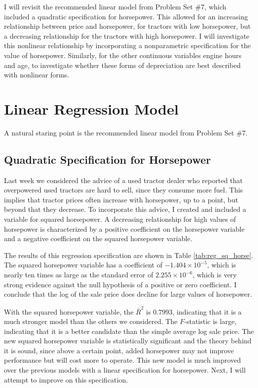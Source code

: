 \documentclass[11pt]{paper}
\begin{document}
I will revisit the recommended linear model
from Problem Set \#7, 
which included a quadratic specification for horsepower.
This allowed for an increasing relationship 
between price and horsepower, 
for tractors with low horsepower, 
but a decreasing relationship for the tractors with high horsepower. 
I will investigate this nonlinear relationship
by incorporating a nonparametric specification
for the value of horsepower. 
Similarly, for the other continuous variables engine hours and age, 
to investigate whether these forms of depreciation
are best described with nonlinear forms. 


\clearpage
\section{Linear Regression Model}

A natural staring point is the recommended linear model
from Problem Set \#7. 

\subsection{Quadratic Specification for Horsepower}

Last week we considered the advice of
a used tractor dealer who reported that overpowered used tractors are hard to sell, since they consume more fuel. 
This implies that tractor prices often increase with horsepower, up to a point, but beyond that they decrease. 
To incorporate this advice, I created and included a variable for squared horsepower. 
A decreasing relationship for high values of horsepower
is characterized by 
a positive coefficient on the horsepower variable and
a negative coefficient on the squared horsepower variable. 

% 

% 

The results of this regression specification are shown in 
Table \ref{tab:reg_sq_horse}. 
The squared horsepower variable has a coefficient of 
$-1.404\times10^{-5}$,  
which is nearly ten times as large as the standard error of 
$2.255\times10^{-6}$, 
which is very strong evidence against the null hypothesis of a positive or zero coefficient. 
I conclude that the log of the sale price does decline for large values of horsepower. 


With the squared horsepower variable, the $\bar{R}^2$ is $0.7993$, indicating that it is a much stronger model than the others we considered. 
The $F$-statistic is large, indicating that it is a better candidate than the simple average log sale price. 
The new squared horsepower variable is statistically significant and the theory behind it is sound, since above a certain point, added horsepower may not improve performance but will cost more to operate. 
This new model is much improved over the previous models with a linear specification for horsepower.
Next, I will attempt to improve on this specification. 
\end{document}
